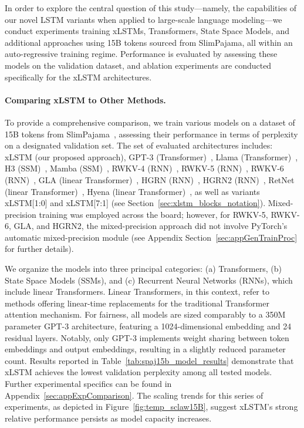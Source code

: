 In order to explore the central question of this study—namely, the capabilities of our novel LSTM variants when applied to large-scale language modeling—we conduct experiments training xLSTMs, Transformers, State Space Models, and additional approaches using 15B tokens sourced from SlimPajama, all within an auto-regressive training regime. Performance is evaluated by assessing these models on the validation dataset, and ablation experiments are conducted specifically for the xLSTM architectures.

\paragraph{Comparing xLSTM to Other Methods.} To provide a comprehensive comparison, we train various models on a dataset of 15B tokens from SlimPajama~\citep{Soboleva:23}, assessing their performance in terms of perplexity on a designated validation set. The set of evaluated architectures includes: xLSTM (our proposed approach), GPT-3 (Transformer)~\citep{Brown:20short}, Llama (Transformer)~\citep{Touvron:23arxiv}, H3 (SSM)~\citep{Fu:23}, Mamba (SSM)~\citep{Gu:24arxiv}, RWKV-4 (RNN)~\citep{Peng:23arxivshort}, RWKV-5 (RNN)~\citep{Peng:24arxivshort}, RWKV-6 (RNN)~\citep{Peng:24arxivshort}, GLA (linear Transformer)~\citep{Yang:23arxiv}, HGRN (RNN)~\citep{Qin:23}, HGRN2 (RNN)~\citep{Qin:24arxiv}, RetNet (linear Transformer)~\citep{Sun:23arxiv}, Hyena (linear Transformer)~\citep{Poli:23}, as well as variants xLSTM[1:0] and xLSTM[7:1] (see Section~\ref{sec:xlstm_blocks_notation}). Mixed-precision training was employed across the board; however, for RWKV-5, RWKV-6, GLA, and HGRN2, the mixed-precision approach did not involve PyTorch's automatic mixed-precision module (see Appendix Section~\ref{sec:appGenTrainProc} for further details).

We organize the models into three principal categories: (a) Transformers, (b) State Space Models (SSMs), and (c) Recurrent Neural Networks (RNNs), which include linear Transformers. Linear Transformers, in this context, refer to methods offering linear-time replacements for the traditional Transformer attention mechanism. For fairness, all models are sized comparably to a 350M parameter GPT-3 architecture, featuring a 1024-dimensional embedding and 24 residual layers. Notably, only GPT-3 implements weight sharing between token embeddings and output embeddings, resulting in a slightly reduced parameter count. Results reported in Table~\ref{tab:spaj15b_model_results} demonstrate that xLSTM achieves the lowest validation perplexity among all tested models. Further experimental specifics can be found in Appendix~\ref{sec:appExpComparison}. The scaling trends for this series of experiments, as depicted in Figure~\ref{fig:temp_sclaw15B}, suggest xLSTM's strong relative performance persists as model capacity increases.

